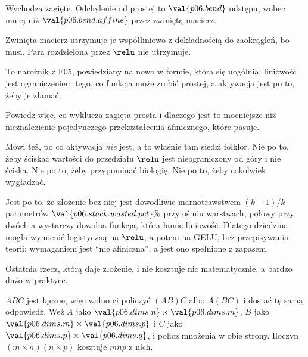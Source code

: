\begin{fr}
\begin{ansblock}
Wychodzą zagięte. Odchylenie od prostej to
$\val{p06.bend}$ odstępu, wobec mniej niż $\val{p06.bend.affine}$ przez
zwiniętą macierz.
\end{ansblock}

Zwinięta macierz utrzymuje je współliniowo z dokładnością do zaokrągleń, bo
musi. Para rozdzielona przez $\relu$ nie utrzymuje.

To narożnik z F05, powiedziany na nowo w formie, która się uogólnia: liniowość
jest ograniczeniem tego, co funkcja może zrobić prostej, a aktywacja jest po
to, żeby je złamać.

Powiedz więc, co wyklucza zagięta prosta i dlaczego jest to mocniejsze niż
nieznalezienie pojedynczego przekształcenia afinicznego, które pasuje.
\dotline
\nextframe
\end{fr}

\begin{fr}
\begin{aibox}
Mówi też, po co aktywacja \emph{nie} jest, a to właśnie tam siedzi folklor. Nie
po to, żeby ściskać wartości do przedziału \dash{} $\relu$ jest nieograniczony
od góry i nie ściska. Nie po to, żeby przypominać biologię. Nie po to, żeby
cokolwiek wygładzać.

Jest po to, że złożenie bez niej jest dowodliwie marnotrawstwem $(k-1)/k$
parametrów \dash{} $\val{p06.stack.wasted.pct}\%$ przy ośmiu warstwach, połowy
przy dwóch \dash{} a wystarczy dowolna funkcja, która łamie liniowość.
Dlatego dziedzina mogła wymienić logistyczną na $\relu$, a
potem na GELU, bez przepisywania teorii: wymaganiem jest
\enquote{nie afiniczna}, a jest ono spełnione z zapasem.
\end{aibox}
\end{fr}

\begin{fr}
Ostatnia rzecz, którą daje złożenie, i nie kosztuje nic matematycznie, a bardzo
dużo w praktyce.

$ABC$ jest łączne, więc wolno ci policzyć $(AB)C$ albo $A(BC)$ i dostać tę samą
odpowiedź. Weź $A$ jako $\val{p06.dims.n} \times \val{p06.dims.m}$, $B$ jako
$\val{p06.dims.m} \times \val{p06.dims.p}$ i $C$ jako
$\val{p06.dims.p} \times \val{p06.dims.q}$, i policz mnożenia w obie strony.
Iloczyn $(m \times n)(n \times p)$ kosztuje $mnp$ z nich.
\dotline
\nextframe
\end{fr}


